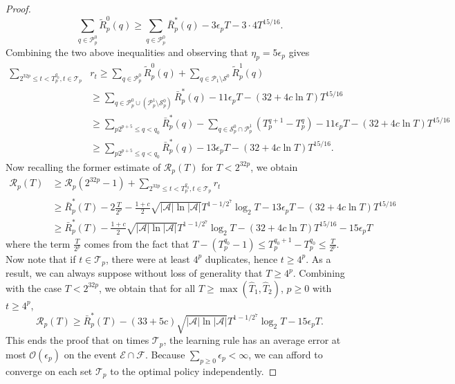 \documentclass[aos]{imsart}
\theoremstyle{plain}
\theoremstyle{remark}
\newcommand{\Acal}{\mathcal{A}}
\newcommand{\Ecal}{\mathcal{E}}
\newcommand{\Fcal}{\mathcal{F}}
\newcommand{\Pcal}{\mathcal{P}}
\newcommand{\Rcal}{\mathcal{R}}
\newcommand{\Scal}{\mathcal{S}}
\newcommand{\Tcal}{\mathcal{T}}
\newcommand{\Ocal}{\mathcal{O}}
\newcommand{\1}{\mathbbm{1}}%
\begin{document}
\begin{proof}
\begin{equation*}
    \sum_{q\in\Pcal^0_p} \tilde R^0_p(q) \geq \sum_{q\in\Pcal^0_p}\bar R_p^*(q) - 3\epsilon_p T - 3\cdot 4 T^{15/16}  .
\end{equation*}
Combining the two above inequalities and observing that $\eta_p= 5\epsilon_p$ gives
\begin{align*}
    \sum_{2^{32p}\leq t<T^{q_0}_p, t\in\Tcal_p}&r_t \geq \sum_{q\in \Pcal^0_p}\tilde R^0_p(q) + \sum_{q\in \Pcal_1\setminus\Scal^0}\tilde R^1_p(q)\\
    &\geq \sum_{q\in \Pcal^0_p\cup (\Pcal^1_p\setminus\Scal^0_p)} \bar R_p^*(q) - 11\epsilon_p T -(32+4c\ln T)T^{15/16}\\
    &\geq \sum_{p2^{p+5}\leq q<q_0}\bar R_p^*(q) - \sum_{q\in\Scal^0_p\cap\Pcal^1_p} (T^{q+1}_p - T^q_p) - 11\epsilon_p T -(32+4c\ln T)T^{15/16}\\
    &\geq \sum_{p2^{p+5}\leq q<q_0}\bar R_p^*(q) - 13\epsilon_p T -(32+4c\ln T)T^{15/16}.
\end{align*}
Now recalling the former estimate of $\Rcal_p(T)$ for $T<2^{32p}$, we obtain
\begin{align*}
    \Rcal_p(T) &\geq \Rcal_p(2^{32p}-1) + \sum_{2^{32p}\leq t<T^{q_0}_p, t\in\Tcal_p}r_t\\
    &\geq \bar R^*_p(T)- 2\frac{T}{2^p}  -  \frac{1+c}{2}\sqrt{|\Acal|\ln|\Acal|}T^{1-1/2^7}\log_2 T  - 13\epsilon_p T -(32+4c\ln T)T^{15/16}\\
    &\geq  \bar R^*_p(T) -  \frac{1+c}{2}\sqrt{|\Acal|\ln|\Acal|}T^{1-1/2^7}\log_2 T -(32+4c\ln T)T^{15/16}  - 15\epsilon_p T
\end{align*}
where the term $\frac{T}{2^p}$ comes from the fact that $T-(T^{q_0}_p-1)\leq T^{q_0+1}_p-T^{q_0}_p\leq \frac{T}{2^p}$.
Now note that if $t\in\Tcal_p$, there were at least $4^p$ duplicates, hence $t\geq 4^p$. As a result, we can always suppose without loss of generality that $T\geq 4^p$. Combining with the case $T<2^{32p}$, we obtain that for all $T\geq \max(\hat T_1,\hat T_2)$, $p\geq 0$ with $t\geq 4^p$,
\begin{equation}\label{eq:estimate_on_category}
    \Rcal_p(T) \geq \bar R^*_p(T) - (33+5c) \sqrt{|\Acal|\ln|\Acal|}T^{1-1/2^7}\log_2 T - 15\epsilon_pT.
\end{equation}
This ends the proof that on times $\Tcal_p$, the learning rule has an average error at most $\Ocal(\epsilon_p)$ on the event $\Ecal\cap\Fcal$. Because $\sum_{p\geq 0}\epsilon_p<\infty$, we can afford to converge on each set $\Tcal_p$ to the optimal policy independently. 


\end{proof}
\end{document}
